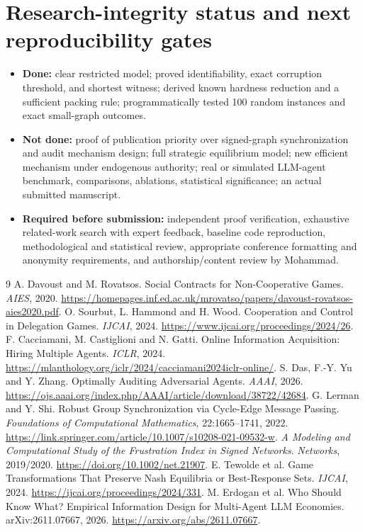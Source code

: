 \documentclass[10pt,a4paper]{article}
\theoremstyle{definition}\newtheorem{definition}[theorem]{Definition}
\begin{document}
\section*{Research-integrity status and next reproducibility gates}
\begin{itemize}
\item \textbf{Done:} clear restricted model; proved identifiability, exact corruption threshold, and shortest witness; derived known hardness reduction and a sufficient packing rule; programmatically tested 100 random instances and exact small-graph outcomes.
\item \textbf{Not done:} proof of publication priority over signed-graph synchronization and audit mechanism design; full strategic equilibrium model; new efficient mechanism under endogenous authority; real or simulated LLM-agent benchmark, comparisons, ablations, statistical significance; an actual submitted manuscript.
\item \textbf{Required before submission:} independent proof verification, exhaustive related-work search with expert feedback, baseline code reproduction, methodological and statistical review, appropriate conference formatting and anonymity requirements, and authorship/content review by Mohammad.
\end{itemize}

\begin{thebibliography}{9}\small
{} A. Davoust and M. Rovatsos. Social Contracts for Non-Cooperative Games. \emph{AIES}, 2020. \url{https://homepages.inf.ed.ac.uk/mrovatso/papers/davoust-rovatsos-aies2020.pdf}.
 O. Sourbut, L. Hammond and H. Wood. Cooperation and Control in Delegation Games. \emph{IJCAI}, 2024. \url{https://www.ijcai.org/proceedings/2024/26}.
 F. Cacciamani, M. Castiglioni and N. Gatti. Online Information Acquisition: Hiring Multiple Agents. \emph{ICLR}, 2024. \url{https://mlanthology.org/iclr/2024/cacciamani2024iclr-online/}.
 S. Das, F.-Y. Yu and Y. Zhang. Optimally Auditing Adversarial Agents. \emph{AAAI}, 2026. \url{https://ojs.aaai.org/index.php/AAAI/article/download/38722/42684}.
 G. Lerman and Y. Shi. Robust Group Synchronization via Cycle-Edge Message Passing. \emph{Foundations of Computational Mathematics}, 22:1665--1741, 2022. \url{https://link.springer.com/article/10.1007/s10208-021-09532-w}.
 \emph{A Modeling and Computational Study of the Frustration Index in Signed Networks}. \emph{Networks}, 2019/2020. \url{https://doi.org/10.1002/net.21907}.
 E. Tewolde et al. Game Transformations That Preserve Nash Equilibria or Best-Response Sets. \emph{IJCAI}, 2024. \url{https://ijcai.org/proceedings/2024/331}.
 M. Erdogan et al. Who Should Know What? Empirical Information Design for Multi-Agent LLM Economies. arXiv:2611.07667, 2026. \url{https://arxiv.org/abs/2611.07667}.
\end{thebibliography}
\end{document}
